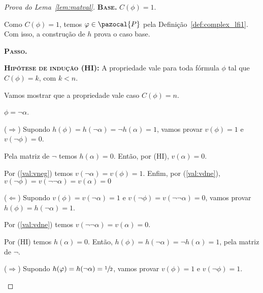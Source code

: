 \begin{proof}[Prova do Lema~\ref{lem:matval}]
            \noindent \textbf{\textsc{Base.}} $C(\phi) = 1$.

            Como $C(\phi) = 1$, temos $\phi \in \pazocal{P}$ pela Definição~\ref{def:complex_lfi1}. Com isso, a construção de $h$ prova o caso base.

            
            \noindent \textbf{\textsc{Passo.}} 

            \noindent \textbf{\textsc{Hipótese de indução (HI):}} A propriedade vale para toda fórmula $\phi$ tal que $C(\phi) = k$, com $k < n$.

            Vamos mostrar que a propriedade vale caso $C(\phi) = n$.

            \begin{provaporcasos}
                \casodeprova{} $\phi = \neg \alpha$.
                    
                    \begin{provaporsubcasos}
                            
                            ($\Longrightarrow$) Supondo $h(\phi) = h(\neg \alpha) = \neg h(\alpha) = 1$, vamos provar $v(\phi) = 1$ e $v(\neg \phi) = 0$. 
                            
                            Pela matriz de $\neg$ temos $h(\alpha) = 0$. Então, por (HI), $v(\alpha) = 0$. 
                            
                            Por (\ref{val:vneg}) temos $v(\neg \alpha) = v(\phi) = 1$. Enfim, por (\ref{val:vdne}), $v(\neg \phi) = v(\neg \neg \alpha) = v(\alpha) = 0$
                            
                            
                            ($\Longleftarrow$) Supondo $v(\phi) = v(\neg \alpha) = 1$ e $v(\neg \phi) = v(\neg \neg \alpha) = 0$, vamos provar $h(\phi) = h(\neg \alpha) = 1$.
                            
                            Por (\ref{val:vdne}) temos $v(\neg \neg \alpha) = v(\alpha) = 0$.
                            
                            Por (HI) temos $h(\alpha) = 0$. Então, $h(\phi) = h(\neg \alpha) = \neg h(\alpha) = 1$, pela matriz de $\neg$.
                        
                        
                            ($\Longrightarrow$) Supondo $h(\varphi) = h(\neg \alpha) = \sfrac{1}{2}{}$, vamos provar $v(\phi) = 1$ e $v(\neg \phi) = 1$.
                            

\end{provaporsubcasos}
\end{provaporcasos}
\end{proof}
